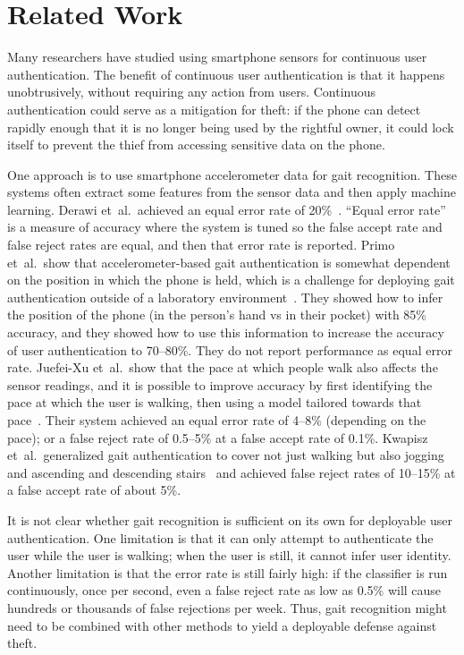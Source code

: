 \section{Related Work}

Many researchers have studied using smartphone sensors for continuous user authentication.
The benefit of continuous user authentication is that it happens unobtrusively, without requiring any action from users.
Continuous authentication could serve as a mitigation for theft: if the phone can detect rapidly enough that it is no longer being used by the rightful owner, it could lock itself to prevent the thief from accessing sensitive data on the phone. 


One approach is to use smartphone accelerometer data for gait recognition.
These systems often extract some features from the sensor data and then apply machine learning.
Derawi et~al.\ achieved an equal error rate of 20\%~\cite{derawi:gait}.
``Equal error rate'' is a measure of accuracy where the system is tuned so the false accept rate and false reject rates are equal, and then that error rate is reported.
Primo et~al.\ show that accelerometer-based gait authentication is somewhat dependent on the position in which the phone is held, which is a challenge for deploying gait authentication outside of a laboratory environment~\cite{primo:context}. 
They showed how to infer the position of the phone (in the person's hand vs in their pocket) with 85\% accuracy, and they showed how to use this information to increase the accuracy of user authentication to 70--80\%.
They do not report performance as equal error rate.
Juefei-Xu et~al.\ show that the pace at which people walk also affects the sensor readings, and it is possible to improve accuracy by first identifying the pace at which the user is walking, then using a model tailored towards that pace~\cite{xu:pace}.
Their system achieved an equal error rate of 4--8\% (depending on the pace); or a false reject rate of 0.5--5\% at a false accept rate of 0.1\%.
Kwapisz et~al.\ generalized gait authentication to cover not just walking but also jogging and ascending and descending stairs~\cite{kwapisz:biometrics} and
achieved false reject rates of 10--15\% at a false accept rate of about 5\%.

It is not clear whether gait recognition is sufficient on its own for deployable user authentication.
One limitation is that it can only attempt to authenticate the user while the user is walking; when the user is still, it cannot infer user identity.
Another limitation is that the error rate is still fairly high: if the classifier is run continuously, once per second, even a false reject rate as low as 0.5\% will cause hundreds or thousands of false rejections per week.
Thus, gait recognition might need to be combined with other methods to yield a deployable defense against theft.

